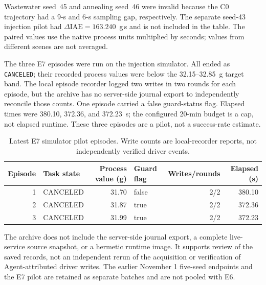 \documentclass[10pt]{article}
\begin{document}
Wastewater seed~45 and annealing seed~46 were invalid because the C0 trajectory had a 9-s and 6-s sampling gap, respectively. The separate seed-43 injection pilot had $\Delta\mathrm{IAE}=163.240$~g\,s and is not included in the table. The paired values use the native process units multiplied by seconds; values from different scenes are not averaged.

The three E7 episodes were run on the injection simulator. All ended as \texttt{CANCELED}; their recorded process values were below the 32.15--32.85~g target band. The local episode recorder logged two writes in two rounds for each episode, but the archive has no server-side journal export to independently reconcile those counts. One episode carried a false guard-status flag. Elapsed times were 380.10, 372.36, and 372.23~s; the configured 20-min budget is a cap, not elapsed runtime. These three episodes are a pilot, not a success-rate estimate.

\begin{table}[h]
\centering
\caption{Latest E7 simulator pilot episodes. Write counts are local-recorder reports, not independently verified driver events.}
\label{tab:s7-e7}
\footnotesize
\begin{tabular}{@{}r l r l r r@{}}
\toprule
Episode & Task state & Process value (g) & Guard flag & Writes/rounds & Elapsed (s) \\
\midrule
1 & CANCELED & 31.70 & false & 2/2 & 380.10 \\
2 & CANCELED & 31.87 & true & 2/2 & 372.36 \\
3 & CANCELED & 31.99 & true & 2/2 & 372.23 \\
\bottomrule
\end{tabular}
\end{table}

The archive does not include the server-side journal export, a complete live-service source snapshot, or a hermetic runtime image. It supports review of the saved records, not an independent rerun of the acquisition or verification of Agent-attributed driver writes. The earlier November 1 five-seed endpoints and the E7 pilot are retained as separate batches and are not pooled with E6.
\end{document}
